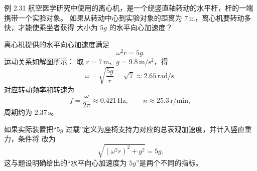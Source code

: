 \clearpage
\begin{origexamplebox}{例 2.31}
航空医学研究中使用的离心机，是一个绕竖直轴转动的水平杆，杆的一端携带一个实验对象。
如果从转动中心到实验对象的距离为 $7\,\mathrm m$，离心机要转动多快，才能使乘坐者获得
大小为 $5g$ 的水平向心加速度？
\end{origexamplebox}

\begin{xesolution}
离心机提供的水平向心加速度满足
\[
 \omega^2r=5g.
\]
运动关系如解图所示：
\soldiagTwoThirtyOne
取 $r=7\,\mathrm m$、$g=9.8\,\mathrm{m/s^2}$，得
\[
 \boxed{\omega=\sqrt{\frac{5g}{r}}=\sqrt7
 \approx2.65\,\mathrm{rad/s}}.
\]
对应转动频率和转速为
\[
 f=\frac{\omega}{2\pi}\approx0.421\,\mathrm{Hz},
 \qquad
 \boxed{n\approx25.3\,\mathrm{r/min}},
\]
周期约为 $2.37\,\mathrm s$。

如果实际装置把“$5g$ 过载”定义为座椅支持力对应的总表观加速度，并计入竖直重力，条件将
改为
\[
 \sqrt{(\omega^2r)^2+g^2}=5g.
\]
这与题设明确给出的“水平向心加速度为 $5g$”是两个不同的指标。
\end{xesolution}
